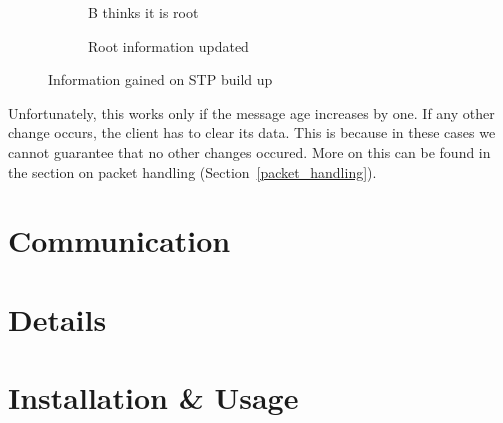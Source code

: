 \begin{figure}
    \begin{centering}
        \begin{subfigure}[b]{0.4\textwidth}
            \caption{B thinks it is root}
        \end{subfigure}
        \hspace{1cm}
        \begin{subfigure}[b]{0.4\textwidth}
            \centering
            \caption{Root information updated}
        \end{subfigure}
    \end{centering}
    \caption{Information gained on STP build up}
    \label{fig:build_up}
\end{figure}
Unfortunately, this works only if the message age increases by one.
If any other change occurs, the client has to clear its data.
This is because in these cases we cannot guarantee that no other changes occured.
More on this can be found in the section on packet handling (Section~\ref{packet_handling}).

\section{Communication}
\section{Details}
\section{Installation \& Usage}
